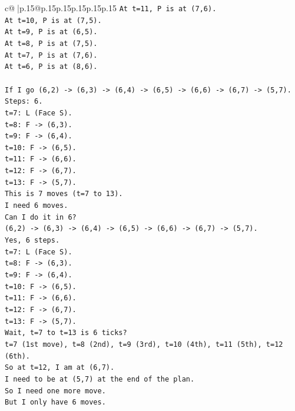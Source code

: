\documentclass{article}
\begin{document}
{\begin{supertabular}{c@{$\;$}|p{.15\linewidth}@{}p{.15\linewidth}p{.15\linewidth}p{.15\linewidth}p{.15\linewidth}p{.15\linewidth}}
{{{\texttt{At t=11, P is at (7,6).} \\
\texttt{At t=10, P is at (7,5).} \\
\texttt{At t=9, P is at (6,5).} \\
\texttt{At t=8, P is at (7,5).} \\
\texttt{At t=7, P is at (7,6).} \\
\texttt{At t=6, P is at (8,6).} \\
\\ 
\texttt{If I go (6,2) {-}> (6,3) {-}> (6,4) {-}> (6,5) {-}> (6,6) {-}> (6,7) {-}> (5,7).} \\
\texttt{Steps: 6.} \\
\texttt{t=7: L (Face S).} \\
\texttt{t=8: F {-}> (6,3).} \\
\texttt{t=9: F {-}> (6,4).} \\
\texttt{t=10: F {-}> (6,5).} \\
\texttt{t=11: F {-}> (6,6).} \\
\texttt{t=12: F {-}> (6,7).} \\
\texttt{t=13: F {-}> (5,7).} \\
\texttt{This is 7 moves (t=7 to 13).} \\
\texttt{I need 6 moves.} \\
\texttt{Can I do it in 6?} \\
\texttt{(6,2) {-}> (6,3) {-}> (6,4) {-}> (6,5) {-}> (6,6) {-}> (6,7) {-}> (5,7).} \\
\texttt{Yes, 6 steps.} \\
\texttt{t=7: L (Face S).} \\
\texttt{t=8: F {-}> (6,3).} \\
\texttt{t=9: F {-}> (6,4).} \\
\texttt{t=10: F {-}> (6,5).} \\
\texttt{t=11: F {-}> (6,6).} \\
\texttt{t=12: F {-}> (6,7).} \\
\texttt{t=13: F {-}> (5,7).} \\
\texttt{Wait, t=7 to t=13 is 6 ticks?} \\
\texttt{t=7 (1st move), t=8 (2nd), t=9 (3rd), t=10 (4th), t=11 (5th), t=12 (6th).} \\
\texttt{So at t=12, I am at (6,7).} \\
\texttt{I need to be at (5,7) at the end of the plan.} \\
\texttt{So I need one more move.} \\
\texttt{But I only have 6 moves.} \\
}}}
\end{supertabular}}
\end{document}

